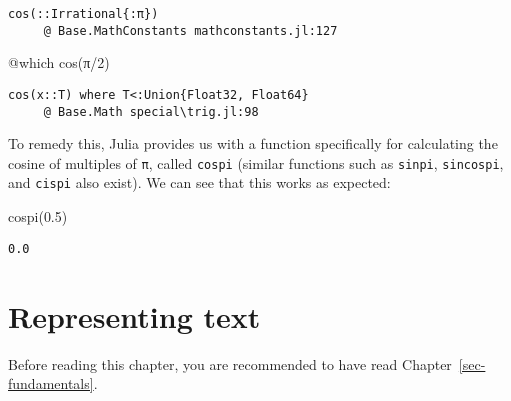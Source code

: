 \documentclass[
  letterpaper,
  DIV=11,
  numbers=noendperiod]{scrreprt}
\newenvironment{Shaded}{\begin{snugshade}}{\end{snugshade}}
\newcommand{\ConstantTok}[1]{\textcolor[rgb]{0.56,0.35,0.01}{#1}}
\newcommand{\FloatTok}[1]{\textcolor[rgb]{0.68,0.00,0.00}{#1}}
\newcommand{\FunctionTok}[1]{\textcolor[rgb]{0.28,0.35,0.67}{#1}}
\newcommand{\NormalTok}[1]{\textcolor[rgb]{0.00,0.23,0.31}{#1}}
\newcommand{\OperatorTok}[1]{\textcolor[rgb]{0.37,0.37,0.37}{#1}}
\newcommand{\PreprocessorTok}[1]{\textcolor[rgb]{0.68,0.00,0.00}{#1}}
\begin{document}
\begin{verbatim}
cos(::Irrational{:π})
     @ Base.MathConstants mathconstants.jl:127
\end{verbatim}

\begin{Shaded}
\begin{Highlighting}[]
\PreprocessorTok{@which} \FunctionTok{cos}\NormalTok{(}\ConstantTok{π}\OperatorTok{/}\FloatTok{2}\NormalTok{)}
\end{Highlighting}
\end{Shaded}

\begin{verbatim}
cos(x::T) where T<:Union{Float32, Float64}
     @ Base.Math special\trig.jl:98
\end{verbatim}

To remedy this, Julia provides us with a function specifically for
calculating the cosine of multiples of \texttt{π}, called \texttt{cospi}
(similar functions such as \texttt{sinpi}, \texttt{sincospi}, and
\texttt{cispi} also exist). We can see that this works as expected:

\begin{Shaded}
\begin{Highlighting}[]
\FunctionTok{cospi}\NormalTok{(}\FloatTok{0.5}\NormalTok{)}
\end{Highlighting}
\end{Shaded}

\begin{verbatim}
0.0
\end{verbatim}

\hypertarget{sec-strings}{%
\chapter{Representing text}\label{sec-strings}}

\begin{tcolorbox}[enhanced jigsaw, toprule=.15mm, opacitybacktitle=0.6, leftrule=.75mm, breakable, coltitle=black, bottomrule=.15mm, colbacktitle=quarto-callout-important-color!10!white, bottomtitle=1mm, rightrule=.15mm, title=\textcolor{quarto-callout-important-color}{\faExclamation}\hspace{0.5em}{Prerequisites}, colframe=quarto-callout-important-color-frame, left=2mm, colback=white, opacityback=0, arc=.35mm, toptitle=1mm, titlerule=0mm]

Before reading this chapter, you are recommended to have read
Chapter~\ref{sec-fundamentals}.

\end{tcolorbox}
\end{document}
